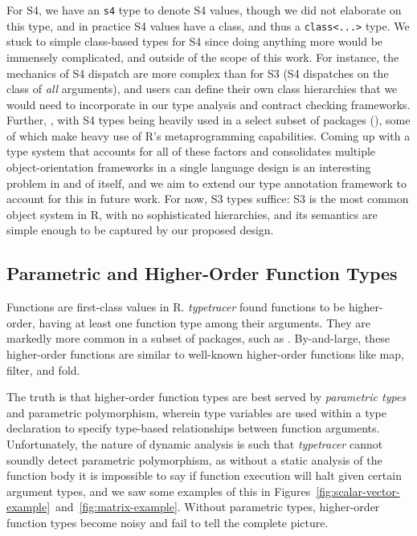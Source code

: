 \documentclass[acmsmall,review,anonymous]{acmart}\settopmatter{printfolios=true,printccs=false,printacmref=false}
\newcommand{\code}[1]{{\lstinline[style=Rin]!#1!}\xspace}
\newcommand{\typetracer}{\emph{typetracer}\xspace} %
\begin{document}
For S4, we have an \code{s4} type to denote S4 values, though we did not elaborate on this type, and in practice S4 values have a class, and thus a \code{class<...>} type.  
We stuck to simple class-based types for S4 since doing anything more would be immensely complicated, and outside of the scope of this work.
For instance, the mechanics of S4 dispatch are more complex than for S3 (S4 dispatches on the class of {\it all} arguments), and users can define their own class hierarchies that we would need to incorporate in our type analysis and contract checking frameworks.  
Further, , with S4 types being heavily used in a select subset of packages (), some of which make heavy use of R's metaprogramming capabilities.  
Coming up with a type system that accounts for all of these factors and consolidates multiple object-orientation frameworks in a single language design is an interesting problem in and of itself, and we aim to extend our type annotation framework to account for this in future work.  
For now, S3 types suffice: S3 is the most common object system in R, with no sophisticated hierarchies, and its semantics are simple enough to be captured by our proposed design.

%
%
%
%
\subsection{Parametric and Higher-Order Function Types}


Functions are first-class values in R.
\typetracer found  functions to be higher-order, having at least one function type among their arguments.
They are markedly more common in a subset of packages, such as .
By-and-large, these higher-order functions are similar to well-known higher-order functions like map, filter, and fold.

The truth is that higher-order function types are best served by {\it parametric types} and parametric polymorphism, wherein type variables are used within a type declaration to specify type-based relationships between function arguments.
Unfortunately, the nature of dynamic analysis is such that \typetracer cannot soundly detect parametric polymorphism, as without a static analysis of the function body it is impossible to say if function execution will halt given certain argument types, and we saw some examples of this in Figures~\ref{fig:scalar-vector-example}~and~\ref{fig:matrix-example}.
Without parametric types, higher-order function types become noisy and fail to tell the complete picture.
\end{document}

